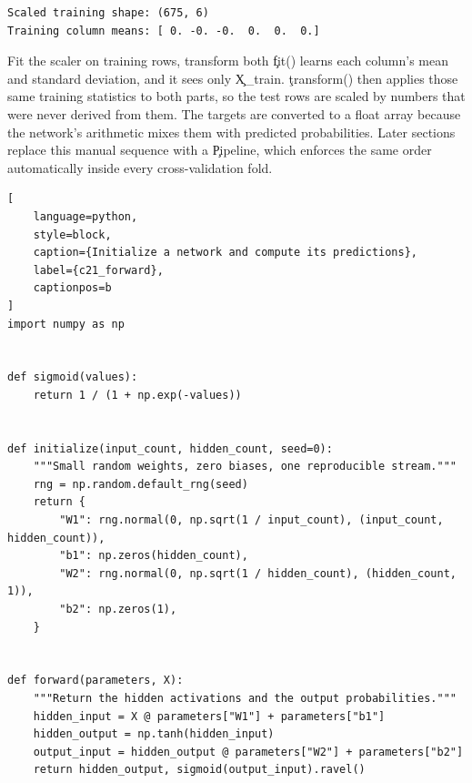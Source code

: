 \begin{lstlisting}[language=text, style=block, caption={Every feature now has mean zero and unit variance}, label={c21_data_output}, captionpos=b]
Scaled training shape: (675, 6)
Training column means: [ 0. -0. -0.  0.  0.  0.]
\end{lstlisting}

\begin{SyntaxBox}{Fit the scaler on training rows, transform both}
\c{fit()} learns each column's mean and standard deviation, and it sees only
\c{X_train}. \c{transform()} then applies those same training statistics to both
parts, so the test rows are scaled by numbers that were never derived from them.
The targets are converted to a float array because the network's arithmetic mixes
them with predicted probabilities. Later sections replace this manual sequence
with a \c{Pipeline}, which enforces the same order automatically inside every
cross-validation fold.
\end{SyntaxBox}


\begin{lstlisting}[
    language=python,
    style=block,
    caption={Initialize a network and compute its predictions},
    label={c21_forward},
    captionpos=b
]
import numpy as np


def sigmoid(values):
    return 1 / (1 + np.exp(-values))


def initialize(input_count, hidden_count, seed=0):
    """Small random weights, zero biases, one reproducible stream."""
    rng = np.random.default_rng(seed)
    return {
        "W1": rng.normal(0, np.sqrt(1 / input_count), (input_count, hidden_count)),
        "b1": np.zeros(hidden_count),
        "W2": rng.normal(0, np.sqrt(1 / hidden_count), (hidden_count, 1)),
        "b2": np.zeros(1),
    }


def forward(parameters, X):
    """Return the hidden activations and the output probabilities."""
    hidden_input = X @ parameters["W1"] + parameters["b1"]
    hidden_output = np.tanh(hidden_input)
    output_input = hidden_output @ parameters["W2"] + parameters["b2"]
    return hidden_output, sigmoid(output_input).ravel()
\end{lstlisting}

